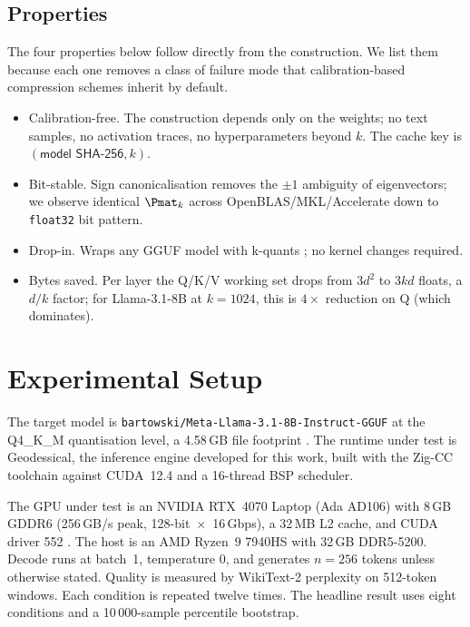 \documentclass[11pt]{article}
\begin{document}
\subsection{Properties}
The four properties below follow directly from the construction. We list
them because each one removes a class of failure mode that calibration-based
compression schemes inherit by default.

\begin{itemize}
\item Calibration-free. The construction depends only on the
weights; no text samples, no activation traces, no hyperparameters beyond
$k$.  The cache key is $(\textsf{model SHA-256}, k)$.
\item Bit-stable.  Sign canonicalisation removes the
$\pm1$ ambiguity of eigenvectors; we observe identical $\Pmat_k$ across
OpenBLAS/MKL/Accelerate down to \texttt{float32} bit pattern.
\item Drop-in.  Wraps any GGUF \cite{ggerganov2023gguf} model with
k-quants \cite{ggerganov2023kquants}; no kernel changes required.
\item Bytes saved.  Per layer the Q/K/V working set drops from
$3d^2$ to $3kd$ floats, a $d/k$ factor; for Llama-3.1-8B at $k{=}1024$, this
is $4\times$ reduction on Q (which dominates).
\end{itemize}
\FloatBarrier

\section{Experimental Setup}
\label{sec:setup}

The target model is \texttt{bartowski/Meta-Llama-3.1-8B-Instruct-GGUF} at
the Q4\_K\_M quantisation level, a 4.58\,GB file footprint
\cite{grattafiori2024llama3,ggerganov2023kquants}. The runtime under test
is Geodessical, the inference engine developed for this work, built with
the Zig-CC toolchain against CUDA~12.4 and a 16-thread BSP scheduler.

The GPU under test is an NVIDIA RTX~4070 Laptop (Ada AD106) with
8\,GB GDDR6 (256\,GB/s peak, 128-bit~$\times$~16\,Gbps), a 32\,MB L2
cache, and CUDA driver 552 \cite{nvidia2022ada}. The host is an AMD
Ryzen~9 7940HS with 32\,GB DDR5-5200. Decode runs at batch~1, temperature
$0$, and generates $n{=}256$ tokens unless otherwise stated. Quality is
measured by WikiText-2 perplexity \cite{merity2016wikitext} on 512-token
windows. Each condition is repeated twelve times. The headline result
uses eight conditions and a 10\,000-sample percentile bootstrap.
\end{document}

